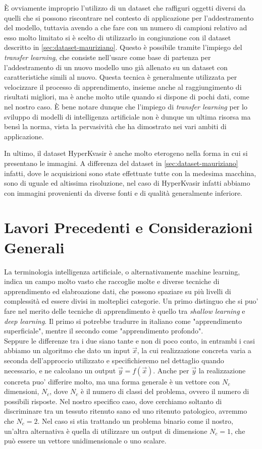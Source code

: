 È ovviamente improprio l'utilizzo di un dataset che raffiguri
oggetti diversi da quelli che si possono riscontrare nel 
contesto di applicazione per l'addestramento del modello,
tuttavia avendo a che fare con un numero di campioni
relativo ad esso molto limitato si è scelto di utilizzarlo
in congiunzione con il dataset descritto in \ref{sec:dataset-mauriziano}.
Questo è possibile tramite l'impiego del {\it transfer learning},
che consiste nell'usare come base di partenza per l'addestramento
di un nuovo modello uno già allenato su un dataset con
caratteristiche simili al nuovo.
Questa tecnica è generalmente utilizzata per velocizzare
il processo di apprendimento, insieme anche al raggiungimento
di risultati migliori, ma è anche molto utile quando si 
dispone di pochi dati, come nel nostro caso.
È bene notare dunque che l'impiego di {\it transfer learning}
per lo sviluppo di modelli di intelligenza artificiale non è
dunque un ultima risorsa ma bensì la norma, vista la
pervasività che ha dimostrato nei vari ambiti di applicazione.

In ultimo, il dataset HyperKvasir è anche molto eterogeno
nella forma in cui si presentano le immagini.
A differenza del dataset in \ref{sec:dataset-mauriziano} infatti,
dove le acquisizioni sono state effettuate tutte con la medesima
macchina, sono di uguale ed altissima risoluzione, nel caso
di HyperKvasir infatti abbiamo con immagini provenienti da diverse
fonti e di qualità generalmente inferiore.


\section{Lavori Precedenti e Considerazioni Generali}

La terminologia intelligenza artificiale, o alternativamente machine learning,
indica un campo molto vasto che raccoglie molte e diverse tecniche di apprendimento
ed elabroazione dati, che possono spaziare su più livelli di complessità ed essere 
divisi in molteplici categorie.
Un primo distinguo che si puo' fare nel merito delle tecniche di apprendimento è quello
tra {\it shallow learning} e {\it deep learning}.
Il primo si potrebbe tradurre in italiano come "apprendimento superficiale",
mentre il secondo come "apprendimento profondo". \\
Seppure le differenze tra i due siano tante e non di poco conto, in entrambi i casi
abbiamo un algoritmo che dato un input $\vec{x}$, la cui realizzazione concreta
varia a seconda dell'approccio utilizzato e specifichieremo nel dettaglio quando
necessario, e ne calcolano un output $\vec{y} = f(\vec{x})$.
Anche per $\vec{y}$ la realizzazione concreta puo' differire molto, 
ma una forma generale è un vettore con $N_c$ dimensioni, $N_c$, dove 
$N_c$ è il numero di classi del problema, ovvero il numero di possibili risposte.
Nel nostro specifico caso, dove cerchiamo soltanto di discriminare tra un tessuto
ritenuto sano ed uno ritenuto patologico, avremmo che $N_c = 2$.
Nel caso si stia trattando un problema binario come il nostro, un'altra alternativa
è quella di utilizzare un output di dimensione $N_c = 1$, che può essere un
vettore unidimensionale o uno scalare.


